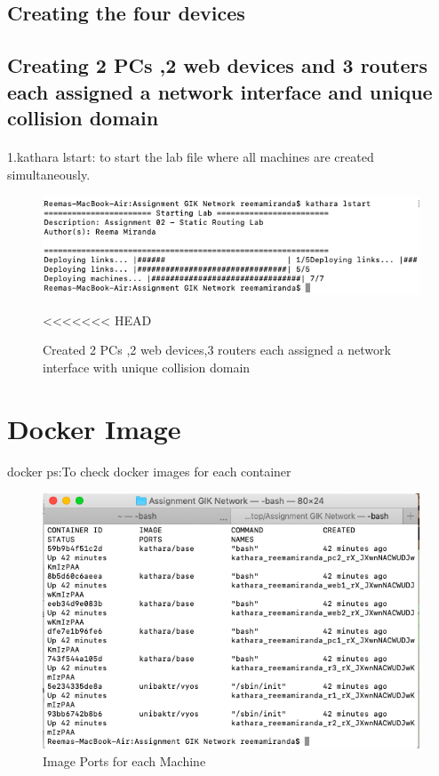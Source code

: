 \subsection{Creating the four devices}
\subsection{Creating 2 PCs ,2 web devices and 3 routers each assigned a network interface and unique collision domain}
\paragraph{}
   1.kathara lstart: to start the lab file where all machines are created simultaneously.
\begin{figure}[H]
\centering
  \includegraphics[width=400pt]{Images/kathara lstart.png}
  \caption{Created 2 PCs ,2 web devices,3 routers each assigned a network interface with unique collision domain}
<<<<<<< HEAD
  \label{fig:2.2}
\end{figure}
\section{Docker Image}
\paragraph{}
docker ps:To check docker images for each container
 \begin{figure}[H]
\centering
  \includegraphics[width=400pt]{Images/docker ps.png}
  \caption{Image Ports for each Machine}
  \label{fig:2.3}
\end{figure}

